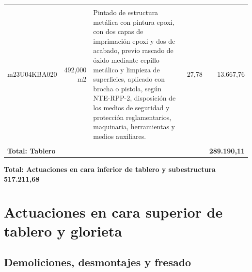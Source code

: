 \documentclass{book}%
\begin{document}
\begin{longtable}{lrlrr}
&&&&\\%
m23U04KBA020&   492,000 m2&\multicolumn{1}{p{5cm}}{Pintado de estructura metálica con pintura epoxi, con dos capas de imprimación epoxi y dos de acabado, previo rascado de óxido mediante cepillo metálico y limpieza de superficies, aplicado con brocha o pistola, según NTE{-}RPP{-}2, disposición de los medios de seguridad y protección reglamentarios, maquinaria, herramientas y medios auxiliares.}&     27,78&13.667,76\\%
&&&&\\%
\multicolumn{4}{p{8cm}}{\textbf{Total: Tablero}}&\textbf{289.190,11}\\%
\end{longtable}%
\normalsize

%
\noindent%
\large%
\textbf{Total: Actuaciones en cara inferior de tablero y subestructura }%
\dotfill%
\textbf{517.211,68}%
\newline%
\normalsize

%
\section{Actuaciones en cara superior de tablero y glorieta}%
\subsection{Demoliciones, desmontajes y fresado}%
\end{document}
